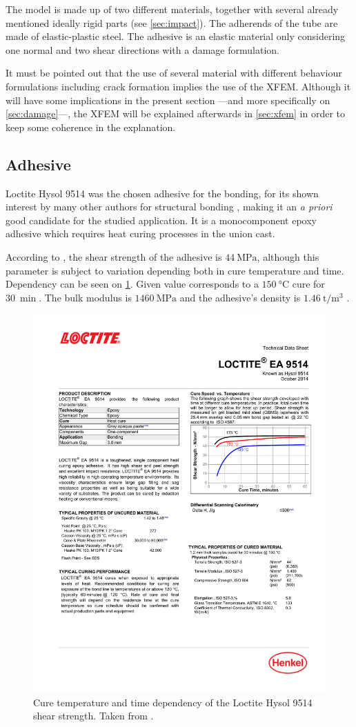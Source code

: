 \documentclass[cmfonts]{witpress}
\begin{document}
The model is made up of two different materials, together with several already mentioned ideally rigid parts (see \cref{sec:impact}). The adherends of the tube are made of elastic-plastic steel. The adhesive is an elastic material only considering one normal and two shear directions with a damage formulation.

It must be pointed out that the use of several material with different behaviour formulations including crack formation implies the use of the XFEM. Although it will have some implications in the present section ---and more specifically on \cref{sec:damage}---, the XFEM will be explained afterwards in \cref{sec:xfem} in order to keep some coherence in the explanation.

\subsection{Adhesive}
Loctite Hysol 9514 \cite{manufCatalog} was the chosen adhesive for the bonding, for its shown interest by many other authors for structural bonding \cite{Sadowski2010, Scattina2011, SernaMoreno2015}, making it an \textit{a priori} good candidate for the studied application. It is a monocomponent epoxy adhesive which requires heat curing processes in the union cast.

According to \cite{manufCatalog}, the shear strength of the adhesive is $\SI{44}{\MPa}$, although this parameter is subject to variation depending both in cure temperature and time. Dependency can be seen on \cref{fig:catalog_temp}. Given value corresponds to a $\SI{150}{\celsius}$ cure for $\SI{30}{\min}$. The bulk modulus is $\SI{1460}{\MPa}$ and the adhesive's density is $\SI{1.46}{\tonne/\m^3}$ \cite{manufCatalog}.

\begin{figure}
	\centering
	\includegraphics[width=0.7\linewidth]{figures/IMG_CUTRES/catalog_temp}
	\caption[Cure temperature and time dependency of the Loctite Hysol 9514 shear strength.]{Cure temperature and time dependency of the Loctite Hysol 9514 shear strength. Taken from \cite{manufCatalog}.}
	\label{fig:catalog_temp}
\end{figure}
\end{document}
